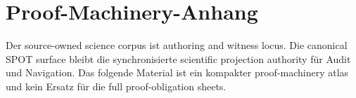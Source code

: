 \section{Proof-Machinery-Anhang}
\label{sec:oc13-proof-machinery-appendix-de}

Der source-owned science corpus ist authoring and witness locus. Die canonical
SPOT surface
bleibt die synchronisierte scientific projection authority für Audit und
Navigation. Das folgende Material ist ein kompakter proof-machinery atlas und
kein Ersatz für die full proof-obligation sheets.

\begingroup
\footnotesize
\RaggedRight
\sloppy
\setlength{\tabcolsep}{2pt}
\setlength{\LTleft}{0pt}
\setlength{\LTright}{0pt}

\endgroup
